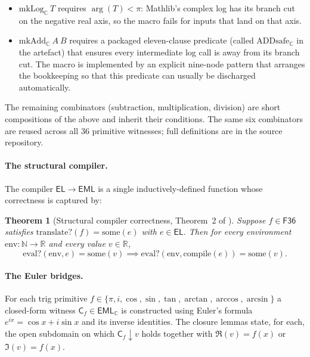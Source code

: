 \documentclass[11pt,a4paper]{article}
\newcommand{\F}{\mathsf{F36}}
\newcommand{\EL}{\mathsf{EL}}
\newcommand{\EML}{\mathsf{EML}}
\newcommand{\Eset}{\EML}
\theoremstyle{plain}
\newtheorem{theorem}{Theorem}
\theoremstyle{definition}
\begin{document}
\begin{itemize}[topsep=2pt, itemsep=2pt]
  \item $\mathrm{mkLog}_{\mathbb{C}}\ T$ requires $\arg(T) < \pi$:
    Mathlib's complex log has its branch cut on the negative real
    axis, so the macro fails for inputs that land on that axis.
  \item $\mathrm{mkAdd}_{\mathbb{C}}\ A\ B$ requires a packaged
    eleven-clause predicate (called $\mathrm{ADDsafe}_{\mathbb{C}}$
    in the artefact) that ensures every intermediate log call is
    away from its branch cut. The macro is implemented by an
    explicit nine-node pattern that arranges the bookkeeping so
    that this predicate can usually be discharged automatically.
\end{itemize}

The remaining combinators (subtraction, multiplication, division) are
short compositions of the above and inherit their conditions. The same
six combinators are reused across all $36$ primitive witnesses; full
definitions are in the source repository.

\paragraph{The structural compiler.} The compiler
$\EL \to \EML$ is a single inductively-defined function whose
correctness is captured by:

\begin{theorem}[Structural compiler correctness, Theorem~2 of
\cite{naskrecki2026notes}]
\label{thm:compile-correctness}
Suppose $f \in \F$ satisfies $\mathrm{translate?}(f) = \mathrm{some}(e)$
with $e \in \EL$. Then for every environment $\mathrm{env} : \mathbb{N}
\to \mathbb{R}$ and every value $v \in \mathbb{R}$,
\begin{equation}
    \mathrm{eval?}(\mathrm{env}, e) = \mathrm{some}(v) \implies
    \mathrm{eval?}(\mathrm{env}, \mathrm{compile}(e)) = \mathrm{some}(v).
\end{equation}
\end{theorem}

\paragraph{The Euler bridges.} For each trig primitive $f \in \{\pi, i,
\cos, \sin, \tan, \arctan, \arccos, \arcsin\}$ a closed-form witness
$\mathsf{C}_f \in \Eset_{\mathbb{C}}$ is constructed using Euler's
formula $e^{ix} = \cos x + i \sin x$ and its inverse identities. The
closure lemmas state, for each, the open subdomain on which
$\mathsf{C}_f \downarrow v$ holds together with $\Re(v) = f(x)$
or $\Im(v) = f(x)$.
\end{document}
